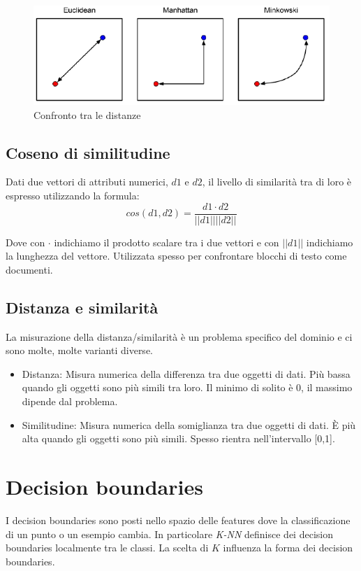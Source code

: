 \begin{figure}
	\centering
	\includegraphics[width=0.6\linewidth]{imgs/chapter3/img2}
	\caption{Confronto tra le distanze}
	\label{fig:chapter03-02}
\end{figure}

\subsection{Coseno di similitudine}

Dati due vettori di attributi numerici, $d1$ e $d2$, il livello di similarità tra di loro \`e espresso utilizzando la formula:
$$cos(d1,d2)=\frac{d1 \cdot d2}{||d1|| ||d2||}$$

Dove con $\cdot$ indichiamo il prodotto scalare tra i due vettori e con $||d1||$ indichiamo la lunghezza del vettore. Utilizzata spesso per confrontare blocchi di testo come documenti.

\subsection{Distanza e similarit\`a}
La misurazione della distanza/similarità \`e un problema specifico del dominio e ci sono molte, molte varianti diverse.
\begin{itemize}
	\item Distanza: Misura numerica della differenza tra due oggetti di dati. Più bassa quando gli oggetti sono più simili tra loro. Il minimo di solito \`e 0, il massimo dipende dal problema.
	\item Similitudine: Misura numerica della somiglianza tra due oggetti di dati. È più alta quando gli oggetti sono più simili. Spesso rientra nell'intervallo [0,1].
\end{itemize}
\section{Decision boundaries}
I decision boundaries sono posti nello spazio delle features dove la classificazione di un punto o un esempio cambia.
In particolare \emph{K-NN} definisce dei decision boundaries localmente tra le classi. La scelta di $K$ influenza la forma dei decision boundaries.

